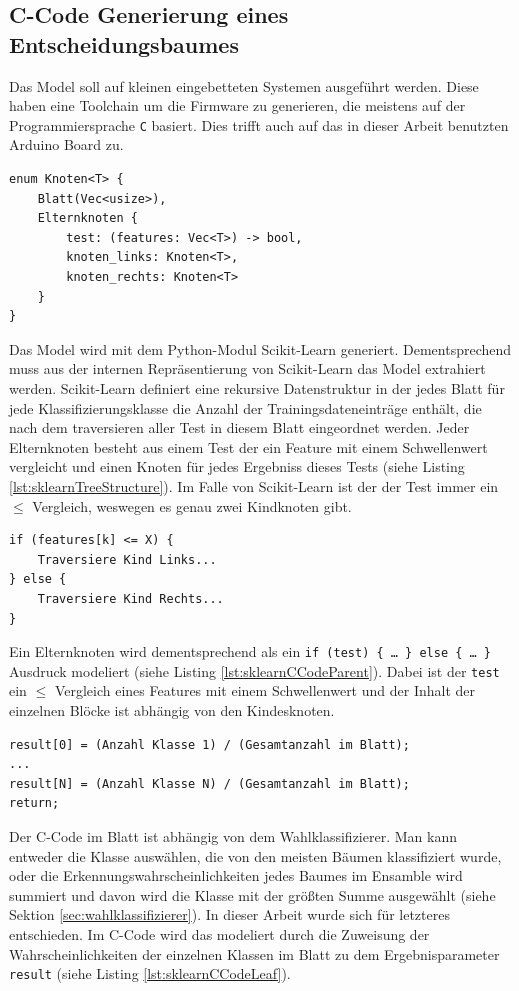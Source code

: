 \subsection{C-Code Generierung eines Entscheidungsbaumes}
\label{sec:cCodeTree}
Das Model soll auf kleinen eingebetteten Systemen ausgeführt werden. Diese haben eine Toolchain um die Firmware zu generieren, die meistens auf der Programmiersprache \texttt{C} basiert. Dies trifft auch auf das in
dieser Arbeit benutzten Arduino Board zu.
\begin{lstlisting}[label=lst:sklearnTreeStructure,caption={Skizze der rekursiven Datenstruktur für Entscheidungsbäume die von Scikit-Learn genutzt wird.}]
enum Knoten<T> {
    Blatt(Vec<usize>),
    Elternknoten {
        test: (features: Vec<T>) -> bool,
        knoten_links: Knoten<T>,
        knoten_rechts: Knoten<T>
    }
}
\end{lstlisting}
Das Model wird mit dem Python-Modul Scikit-Learn generiert. Dementsprechend muss aus der internen Repräsentierung von Scikit-Learn das Model extrahiert werden. Scikit-Learn definiert eine rekursive Datenstruktur in
der jedes Blatt für jede Klassifizierungsklasse die Anzahl der Trainingsdateneinträge enthält, die nach dem traversieren aller Test in diesem Blatt eingeordnet werden. Jeder Elternknoten besteht aus einem Test der
ein Feature mit einem Schwellenwert vergleicht und einen Knoten für jedes Ergebniss dieses Tests (siehe Listing \ref{lst:sklearnTreeStructure}). Im Falle von Scikit-Learn ist der der Test immer
ein $\leq$ Vergleich, weswegen es genau zwei Kindknoten gibt.
\begin{lstlisting}[label=lst:sklearnCCodeParent,caption={C-Code eines Elternknotens.}]
if (features[k] <= X) {
    Traversiere Kind Links...
} else {
    Traversiere Kind Rechts...
}
\end{lstlisting}
Ein Elternknoten wird dementsprechend als ein \texttt{if (test) \{ \ldots\ \} else \{ \ldots\ \}} Ausdruck modeliert (siehe Listing \ref{lst:sklearnCCodeParent}). Dabei ist der \texttt{test} ein $\leq$ Vergleich eines
Features mit einem Schwellenwert und der Inhalt der einzelnen Blöcke ist abhängig von den Kindesknoten.
\begin{lstlisting}[label=lst:sklearnCCodeLeaf,caption={C-Code eines Blattes.}]
result[0] = (Anzahl Klasse 1) / (Gesamtanzahl im Blatt);
...
result[N] = (Anzahl Klasse N) / (Gesamtanzahl im Blatt);
return;
\end{lstlisting}
Der C-Code im Blatt ist abhängig von dem Wahlklassifizierer. Man kann entweder die Klasse auswählen, die von den meisten Bäumen klassifiziert wurde, oder die
Erkennungswahrscheinlichkeiten jedes Baumes im Ensamble wird summiert und davon wird die Klasse mit der größten Summe ausgewählt (siehe Sektion \ref{sec:wahlklassifizierer}).
In dieser Arbeit wurde sich für letzteres entschieden. Im C-Code wird das modeliert durch die Zuweisung der Wahrscheinlichkeiten der einzelnen Klassen im Blatt zu dem Ergebnisparameter
\texttt{result} (siehe Listing \ref{lst:sklearnCCodeLeaf}).

